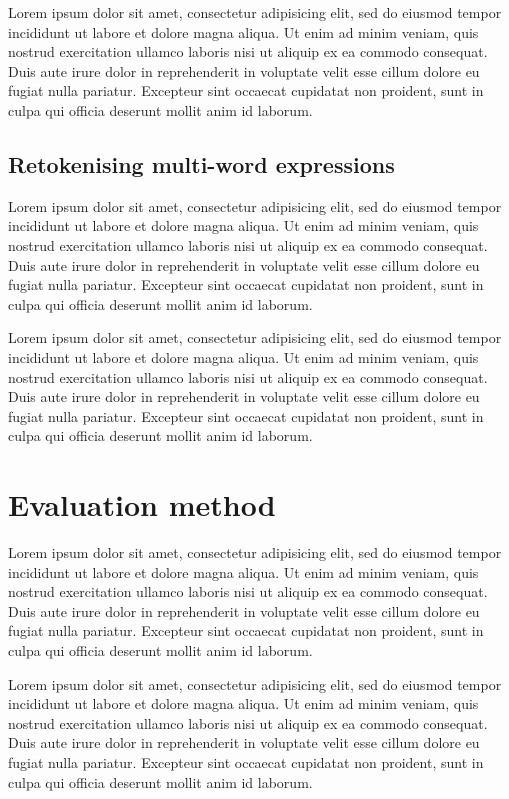 \documentclass[11pt,letterpaper]{article}
\begin{document}
Lorem ipsum dolor sit amet, consectetur adipisicing elit, sed do eiusmod tempor incididunt ut labore et dolore magna aliqua. Ut enim ad minim veniam, quis nostrud exercitation ullamco laboris nisi ut aliquip ex ea commodo consequat. Duis aute irure dolor in reprehenderit in voluptate velit esse cillum dolore eu fugiat nulla pariatur. Excepteur sint occaecat cupidatat non proident, sunt in culpa qui officia deserunt mollit anim id laborum.

\subsection{Retokenising multi-word expressions}

Lorem ipsum dolor sit amet, consectetur adipisicing elit, sed do eiusmod tempor incididunt ut labore et dolore magna aliqua. Ut enim ad minim veniam, quis nostrud exercitation ullamco laboris nisi ut aliquip ex ea commodo consequat. Duis aute irure dolor in reprehenderit in voluptate velit esse cillum dolore eu fugiat nulla pariatur. Excepteur sint occaecat cupidatat non proident, sunt in culpa qui officia deserunt mollit anim id laborum.

Lorem ipsum dolor sit amet, consectetur adipisicing elit, sed do eiusmod tempor incididunt ut labore et dolore magna aliqua. Ut enim ad minim veniam, quis nostrud exercitation ullamco laboris nisi ut aliquip ex ea commodo consequat. Duis aute irure dolor in reprehenderit in voluptate velit esse cillum dolore eu fugiat nulla pariatur. Excepteur sint occaecat cupidatat non proident, sunt in culpa qui officia deserunt mollit anim id laborum.

\section{Evaluation method}

Lorem ipsum dolor sit amet, consectetur adipisicing elit, sed do eiusmod tempor incididunt ut labore et dolore magna aliqua. Ut enim ad minim veniam, quis nostrud exercitation ullamco laboris nisi ut aliquip ex ea commodo consequat. Duis aute irure dolor in reprehenderit in voluptate velit esse cillum dolore eu fugiat nulla pariatur. Excepteur sint occaecat cupidatat non proident, sunt in culpa qui officia deserunt mollit anim id laborum.

Lorem ipsum dolor sit amet, consectetur adipisicing elit, sed do eiusmod tempor incididunt ut labore et dolore magna aliqua. Ut enim ad minim veniam, quis nostrud exercitation ullamco laboris nisi ut aliquip ex ea commodo consequat. Duis aute irure dolor in reprehenderit in voluptate velit esse cillum dolore eu fugiat nulla pariatur. Excepteur sint occaecat cupidatat non proident, sunt in culpa qui officia deserunt mollit anim id laborum.
\end{document}
